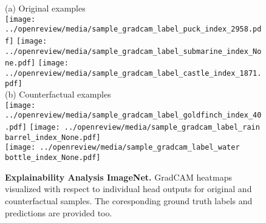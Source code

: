 \begin{figure}[H]
    \centering
    \small (a) Original examples \\
    \texttt{[image: ../openreview/media/sample\_gradcam\_label\_puck\_index\_2958.pdf]}
    \texttt{[image: ../openreview/media/sample\_gradcam\_label\_submarine\_index\_None.pdf]}
    \texttt{[image: ../openreview/media/sample\_gradcam\_label\_castle\_index\_1871.pdf]} \\

    \vspace{1em}
    \small (b) Counterfactual examples \\
    \texttt{[image: ../openreview/media/sample\_gradcam\_label\_goldfinch\_index\_40.pdf]}
    \texttt{[image: ../openreview/media/sample\_gradcam\_label\_rain barrel\_index\_None.pdf]} \\
    \texttt{[image: ../openreview/media/sample\_gradcam\_label\_water bottle\_index\_None.pdf]}



    \caption{\textbf{Explainability Analysis ImageNet.} GradCAM heatmaps visualized with respect to individual head outputs for original and counterfactual samples. The coresponding ground truth labels and predictions are provided too.}
    \label{fig:gradcam-imagenet}
\end{figure}

